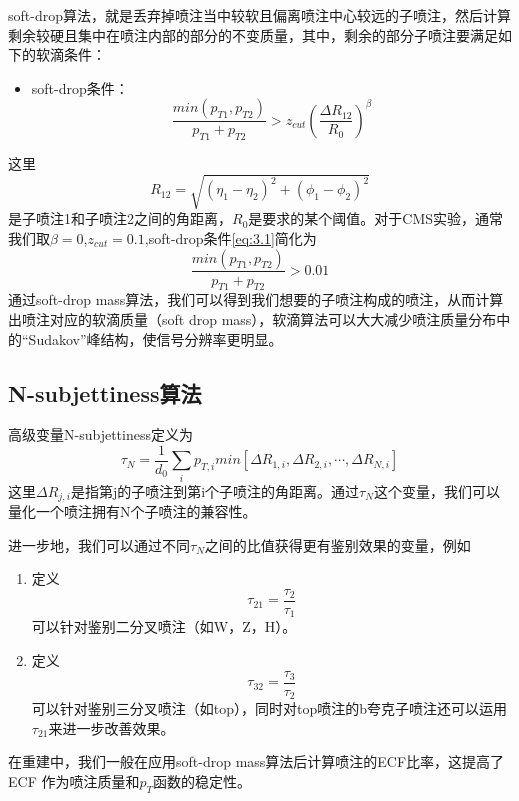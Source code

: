 soft-drop算法，就是丢弃掉喷注当中较软且偏离喷注中心较远的子喷注，然后计算剩余较硬且集中在喷注内部的部分的不变质量，其中，剩余的部分子喷注要满足如下的软滴条件：
\begin{itemize}
    \item soft-drop条件：
    \begin{equation}\label{eq:3.1}
        \frac{min(p_{T1}, p_{T2})}{p_{T1}+p_{T2}}>z_{cut} \left(\frac{\Delta R_{12}}{R_0}\right)^\beta
    \end{equation}
\end{itemize}
这里
\begin{equation}\label{eq:3.2}
    R_{12}=\sqrt{(\eta_1-\eta_2)^2+(\phi_1-\phi_2)^2}
\end{equation}
是子喷注1和子喷注2之间的角距离，$R_0$是要求的某个阈值。对于CMS实验，通常我们取$\beta=0$,$z_{cut}=0.1$,soft-drop条件\eqref{eq:3.1}简化为
\begin{equation}
    \frac{min(p_{T1}, p_{T2})}{p_{T1}+p_{T2}}>0.01
\end{equation}
通过soft-drop mass算法，我们可以得到我们想要的子喷注构成的喷注，从而计算出喷注对应的软滴质量（soft drop mass），软滴算法可以大大减少喷注质量分布中的“Sudakov”峰结构，使信号分辨率更明显。
\subsection{N-subjettiness算法}
高级变量N-subjettiness定义为
\begin{equation}
    \tau_N=\frac{1}{d_0}\sum_i p_{T,i}min\left[\Delta R_{1,i},\Delta R_{2,i},\cdots,\Delta R_{N,i}\right]
\end{equation}
这里$\Delta R_{j,i}$是指第j的子喷注到第i个子喷注的角距离。通过$\tau_N$这个变量，我们可以量化一个喷注拥有N个子喷注的兼容性。

进一步地，我们可以通过不同$\tau_N$之间的比值获得更有鉴别效果的变量，例如
\begin{enumerate}[(1)]
    \item 定义
    \begin{equation}
        \tau_{21}=\frac{\tau_2}{\tau_1}
    \end{equation}
    可以针对鉴别二分叉喷注（如W，Z，H）。
    \item 定义
    \begin{equation}
        \tau_{32}=\frac{\tau_3}{\tau_2}
    \end{equation}
    可以针对鉴别三分叉喷注（如top），同时对top喷注的b夸克子喷注还可以运用$\tau_{21}$来进一步改善效果。
\end{enumerate}
在重建中，我们一般在应用soft-drop mass算法后计算喷注的ECF比率，这提高了 ECF 作为喷注质量和$p_T$函数的稳定性。

